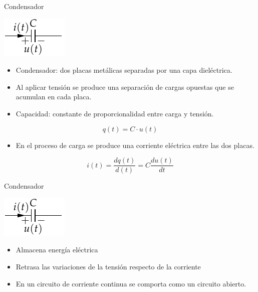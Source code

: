 \documentclass[xcolor={usenames,svgnames,dvipsnames}]{beamer}
\begin{document}
\begin{frame}[label={sec:org43aab33}]{Condensador}
\begin{center}
\includegraphics[height=0.2\textheight]{../figs/Condensador.pdf}
\end{center}

\begin{itemize}
\item \alert{Condensador}: dos placas metálicas separadas por una capa dieléctrica.

\item Al aplicar tensión se produce una \alert{separación de cargas opuestas que
se acumulan en cada placa}.

\item \alert{Capacidad}: constante de proporcionalidad entre carga y tensión.
\end{itemize}
\[
q(t) = C \cdot u(t)
\]

\begin{itemize}
\item En el proceso de carga se produce una corriente eléctrica entre las
dos placas.
\end{itemize}
\[
i(t)=\frac{dq(t)}{d(t)}=C\frac{du(t)}{dt}
\]
\end{frame}


\begin{frame}[label={sec:org94882b3}]{Condensador}
\begin{center}
\includegraphics[height=0.2\textheight]{../figs/Condensador.pdf}
\end{center}

\begin{itemize}
\item Almacena \alert{energía eléctrica}

\item \alert{Retrasa las variaciones de la tensión respecto de la corriente}

\item En un circuito de corriente continua se comporta como un circuito
abierto.
\end{itemize}
\end{frame}
\end{document}
